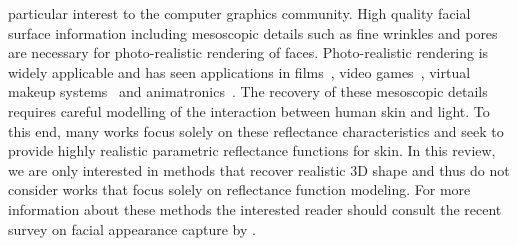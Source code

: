 particular interest to the computer graphics community. High quality facial
surface information including mesoscopic details such as fine wrinkles and pores
are necessary for photo-realistic rendering of faces. Photo-realistic rendering
is widely applicable and has seen applications in
films~\cite{borshukov2005universal}, video games~\cite{vonderPahlen:2014kg},
virtual makeup systems~\cite{scherbaum2011computer} and
animatronics~\cite{jung2011believable}. The recovery of these mesoscopic details
requires careful modelling of the interaction between human skin and light. To
this end, many works focus solely on these reflectance characteristics and seek
to provide highly realistic parametric reflectance functions for skin. In this
review, we are only interested in methods that recover realistic 3D shape and
thus do not consider works that focus solely on reflectance function modeling.
For more information about these methods the interested reader should consult
the recent survey on facial appearance capture by \citet{Klehm:2015jb}.

